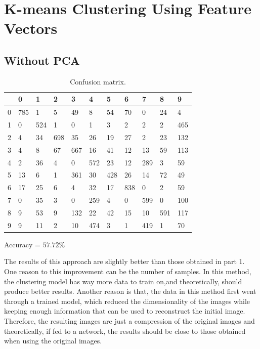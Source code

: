 \documentclass[12pt]{article}
\begin{document}
	\section{K-means Clustering Using Feature Vectors}
		\subsection{Without PCA}
			\begin{table}[h]
				\centering
				\caption{Confusion matrix.}
				\label{tab:my-table}
				\begin{tabular}{l|llllllllll}
					& 0   & 1   & 2   & 3   & 4   & 5   & 6   & 7   & 8   & 9   \\ \hline
					0 & 785 & 1   & 5   & 49  & 8   & 54  & 70  & 0   & 24  & 4   \\
					1 & 0   & 524 & 1   & 0   & 1   & 3   & 2   & 2   & 2   & 465 \\
					2 & 4   & 34  & 698 & 35  & 26  & 19  & 27  & 2   & 23  & 132 \\
					3 & 4   & 8   & 67  & 667 & 16  & 41  & 12  & 13  & 59  & 113 \\
					4 & 2   & 36  & 4   & 0   & 572 & 23  & 12  & 289 & 3   & 59  \\
					5 & 13  & 6   & 1   & 361 & 30  & 428 & 26  & 14  & 72  & 49  \\
					6 & 17  & 25  & 6   & 4   & 32  & 17  & 838 & 0   & 2   & 59  \\
					7 & 0   & 35  & 3   & 0   & 259 & 4   & 0   & 599 & 0   & 100 \\
					8 & 9   & 53  & 9   & 132 & 22  & 42  & 15  & 10  & 591 & 117 \\
					9 & 9   & 11  & 2   & 10  & 474 & 3   & 1   & 419 & 1   & 70 
				\end{tabular}
			\end{table}
		
			Accuracy = $57.72 \%$
			
			The results of this approach are slightly better than those obtained in part 1. One reason to this improvement can be the number of samples. In this method, the clustering model has way more data to train on,and theoretically, should produce better results. Another reason is that, the data in this method first went through a trained model, which reduced the dimensionality of the images while keeping enough information that can be used to reconstruct the initial image. Therefore, the resulting images are just a compression of the original images and theoretically, if fed to a network, the results should be close to those obtained when using the original images. 
		
\end{document}
